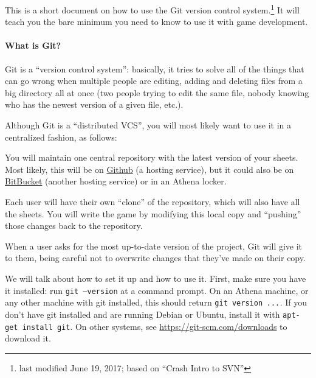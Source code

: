 \documentclass[green]{testgame}
\begin{document}
\newcommand{\ter}[1]{\fbox{\parbox{6.5in}{{\tt #1}}}}


This is a short document on how to use the Git version control
system.\footnote{last modified June 19, 2017; based on ``Crash Intro to SVN''} It will teach you the
bare minimum you need to know to use it with game development.

\paragraph*{What is Git?}

Git is a ``version control system'': basically,
it tries to solve all of the things that can go wrong when multiple
people are editing, adding and deleting files from a big directory all
at once (two people trying to edit the same file, nobody knowing who
has the newest version of a given file, etc.).

Although Git is a ``distributed VCS'', you will most likely want to use it in a centralized fashion, as follows:


\begin{itemz}[]

\item You will maintain one central repository with the latest version of your sheets. Most likely, this will be on \href{https://github.com}{Github} (a hosting service), but it could also be on \href{https://bitbucket.org/}{BitBucket} (another hosting service) or in an Athena locker.

\item Each user will have their own ``clone'' of the repository, which will also have all the sheets. You will write the game by modifying this local copy and ``pushing'' those changes back to the repository.

\item When a user asks for the most up-to-date version of the project, Git will give it to them, being careful not to overwrite changes that they've made on their copy.

\end{itemz}

We will talk about how to set it up and how to use it. First, make sure you have it installed: run \texttt{git --version} at a command prompt. On an Athena machine, or any other machine with git installed, this should return \texttt{git version \textit{...}}. If you don't have git installed and are running Debian or Ubuntu, install it with \texttt{apt-get install git}. On other systems, see \url{https://git-scm.com/downloads} to download it.
\end{document}
